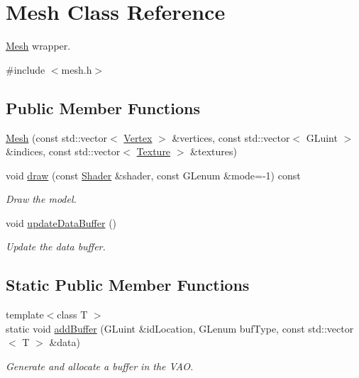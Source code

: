 \hypertarget{classMesh}{}\section{Mesh Class Reference}
\label{classMesh}


\hyperlink{classMesh}{Mesh} wrapper.  




{\ttfamily \#include $<$mesh.\+h$>$}

\subsection*{Public Member Functions}
\begin{DoxyCompactItemize}
\item 
\hyperlink{classMesh_a54bd1b9e629ff006629579fc8fd6d002}{Mesh} (const std\+::vector$<$ \hyperlink{structVertex}{Vertex} $>$ \&vertices, const std\+::vector$<$ G\+Luint $>$ \&indices, const std\+::vector$<$ \hyperlink{structTexture}{Texture} $>$ \&textures)
\item 
void \hyperlink{classMesh_ab4a351fe96aa532b80232b2d7b0d55f2}{draw} (const \hyperlink{classShader}{Shader} \&shader, const G\+Lenum \&mode=-\/1) const
\begin{DoxyCompactList}\small\item\em Draw the model. \end{DoxyCompactList}\item 
void \hyperlink{classMesh_a66bf5cfb39cc2a96638769ad967be18a}{update\+Data\+Buffer} ()
\begin{DoxyCompactList}\small\item\em Update the data buffer. \end{DoxyCompactList}\end{DoxyCompactItemize}
\subsection*{Static Public Member Functions}
\begin{DoxyCompactItemize}
\item 
{\footnotesize template$<$class T $>$ }\\static void \hyperlink{classMesh_a5067620d30ba35b9f83e4dae7fb70cbf}{add\+Buffer} (G\+Luint \&id\+Location, G\+Lenum buf\+Type, const std\+::vector$<$ T $>$ \&data)
\begin{DoxyCompactList}\small\item\em Generate and allocate a buffer in the V\+AO. \end{DoxyCompactList}\end{DoxyCompactItemize}


